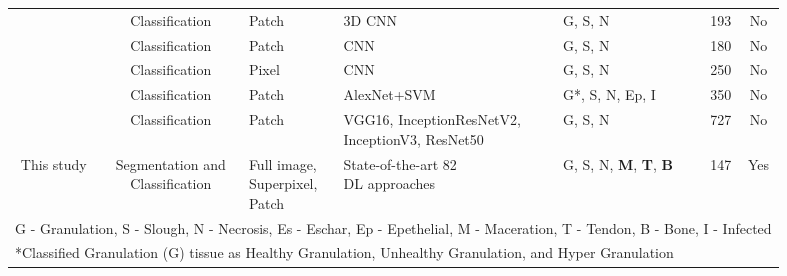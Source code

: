 \begin{table}[!htb]
{\begin{tabular}{@{\extracolsep{4pt}}cclllrc}
\citep{RW35garcia2018classification} & Classification & Patch & 3D CNN  & G, S, N   & 193 & No \\ %
                    
                   
\citep{RW43pholberdee2018study} & Classification  & Patch & CNN  & G, S, N  & 180 & No \\ 
                   
\citep{RW44maity2018pixel} & Classification & Pixel  & CNN & G, S, N & 250 & No \\ 
\citep{RW26nejati2018fine} & Classification & Patch & AlexNet+SVM & G*, S, N, Ep, I  & 350 &  No\\ 

\citep{reifs2023clinical} & Classification & Patch & \makecell[t l]{VGG16, InceptionResNetV2,\\InceptionV3, ResNet50} & G, S, N & 727 & No\\
                   

\hline
                   
                
This study & \makecell[t l]{Segmentation and\\Classification} & \makecell[t l]{Full image,\\Superpixel,\\Patch} & \makecell[t l]{State-of-the-art 82\\ DL approaches} & G, S, N,\textbf{ M}, \textbf{T}, \textbf{B}   & 147 & Yes\\  
\hline 

\hline
\multicolumn{7}{l}{G - Granulation, S - Slough, N - Necrosis, Es - Eschar, Ep - Epethelial, M - Maceration, T - Tendon, B - Bone, I - Infected}\\
\multicolumn{7}{l}{*Classified Granulation (G) tissue as Healthy Granulation, Unhealthy Granulation, and Hyper Granulation}
\end{tabular}
}
\end{table}

